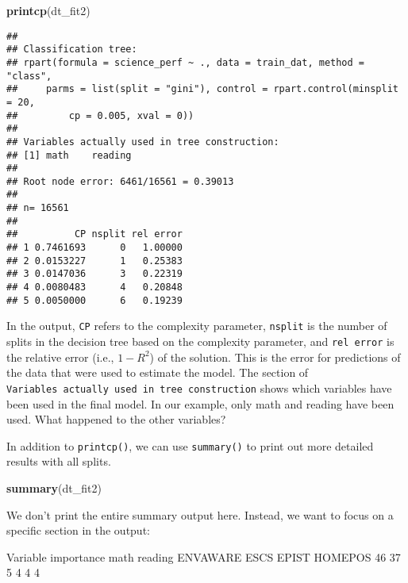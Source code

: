 \documentclass[]{book}
\newenvironment{Shaded}{\begin{snugshade}}{\end{snugshade}}
\newcommand{\DecValTok}[1]{\textcolor[rgb]{0.00,0.00,0.81}{#1}}
\newcommand{\KeywordTok}[1]{\textcolor[rgb]{0.13,0.29,0.53}{\textbf{#1}}}
\newcommand{\NormalTok}[1]{#1}
\begin{document}
\begin{Shaded}
\begin{Highlighting}[]
\KeywordTok{printcp}\NormalTok{(dt_fit2)}
\end{Highlighting}
\end{Shaded}

\begin{verbatim}
## 
## Classification tree:
## rpart(formula = science_perf ~ ., data = train_dat, method = "class", 
##     parms = list(split = "gini"), control = rpart.control(minsplit = 20, 
##         cp = 0.005, xval = 0))
## 
## Variables actually used in tree construction:
## [1] math    reading
## 
## Root node error: 6461/16561 = 0.39013
## 
## n= 16561 
## 
##          CP nsplit rel error
## 1 0.7461693      0   1.00000
## 2 0.0153227      1   0.25383
## 3 0.0147036      3   0.22319
## 4 0.0080483      4   0.20848
## 5 0.0050000      6   0.19239
\end{verbatim}

In the output, \texttt{CP} refers to the complexity parameter, \texttt{nsplit} is the number of splits in the decision tree based on the complexity parameter, and \texttt{rel\ error} is the relative error (i.e., \(1 - R^2\)) of the solution. This is the error for predictions of the data that were used to estimate the model. The section of \texttt{Variables\ actually\ used\ in\ tree\ construction} shows which variables have been used in the final model. In our example, only math and reading have been used. What happened to the other variables?

In addition to \texttt{printcp()}, we can use \texttt{summary()} to print out more detailed results with all splits.

\begin{Shaded}
\begin{Highlighting}[]
\KeywordTok{summary}\NormalTok{(dt_fit2)}
\end{Highlighting}
\end{Shaded}

We don't print the entire summary output here. Instead, we want to focus on a specific section in the output:

\begin{Shaded}
\begin{Highlighting}[]
\NormalTok{Variable importance}
\NormalTok{    math  reading ENVAWARE     ESCS    EPIST  HOMEPOS }
      \DecValTok{46}       \DecValTok{37}        \DecValTok{5}        \DecValTok{4}        \DecValTok{4}        \DecValTok{4}  
\end{Highlighting}
\end{Shaded}
\end{document}

